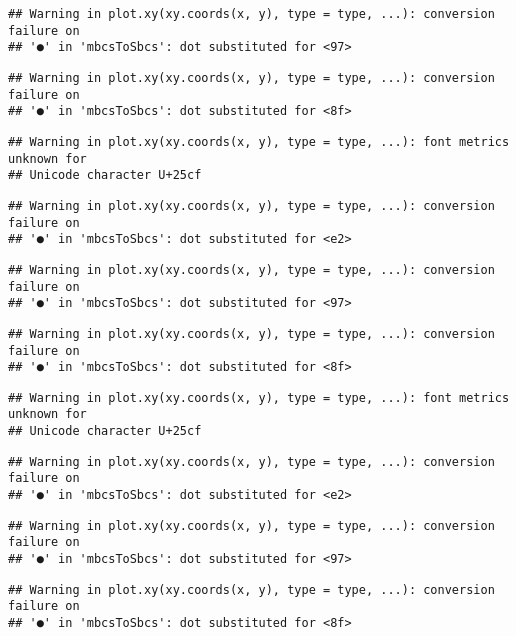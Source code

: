 \documentclass[
]{article}
\begin{document}
\begin{verbatim}
## Warning in plot.xy(xy.coords(x, y), type = type, ...): conversion failure on
## '●' in 'mbcsToSbcs': dot substituted for <97>
\end{verbatim}

\begin{verbatim}
## Warning in plot.xy(xy.coords(x, y), type = type, ...): conversion failure on
## '●' in 'mbcsToSbcs': dot substituted for <8f>
\end{verbatim}

\begin{verbatim}
## Warning in plot.xy(xy.coords(x, y), type = type, ...): font metrics unknown for
## Unicode character U+25cf
\end{verbatim}

\begin{verbatim}
## Warning in plot.xy(xy.coords(x, y), type = type, ...): conversion failure on
## '●' in 'mbcsToSbcs': dot substituted for <e2>
\end{verbatim}

\begin{verbatim}
## Warning in plot.xy(xy.coords(x, y), type = type, ...): conversion failure on
## '●' in 'mbcsToSbcs': dot substituted for <97>
\end{verbatim}

\begin{verbatim}
## Warning in plot.xy(xy.coords(x, y), type = type, ...): conversion failure on
## '●' in 'mbcsToSbcs': dot substituted for <8f>
\end{verbatim}

\begin{verbatim}
## Warning in plot.xy(xy.coords(x, y), type = type, ...): font metrics unknown for
## Unicode character U+25cf
\end{verbatim}

\begin{verbatim}
## Warning in plot.xy(xy.coords(x, y), type = type, ...): conversion failure on
## '●' in 'mbcsToSbcs': dot substituted for <e2>
\end{verbatim}

\begin{verbatim}
## Warning in plot.xy(xy.coords(x, y), type = type, ...): conversion failure on
## '●' in 'mbcsToSbcs': dot substituted for <97>
\end{verbatim}

\begin{verbatim}
## Warning in plot.xy(xy.coords(x, y), type = type, ...): conversion failure on
## '●' in 'mbcsToSbcs': dot substituted for <8f>
\end{verbatim}
\end{document}
